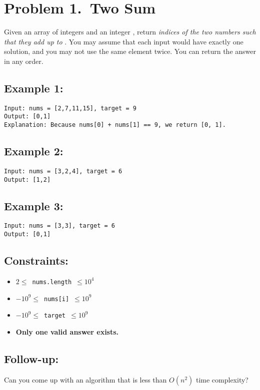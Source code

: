 
\section*{Problem 1.~Two Sum}

Given an array of integers  and an integer , return \textit{indices of the two numbers such that they add up to} . You may assume that each input would have exactly one solution, and you may not use the same element twice. You can return the answer in any order.

\subsection*{Example 1:}

\begin{lstlisting}
Input: nums = [2,7,11,15], target = 9
Output: [0,1]
Explanation: Because nums[0] + nums[1] == 9, we return [0, 1].
\end{lstlisting}


\subsection*{Example 2:}

\begin{lstlisting}
Input: nums = [3,2,4], target = 6
Output: [1,2]
\end{lstlisting}


\subsection*{Example 3:}

\begin{lstlisting}
Input: nums = [3,3], target = 6
Output: [0,1]
\end{lstlisting}


\subsection*{Constraints:}

\begin{itemize}
  \item{$2 \le \,$ \texttt{nums.length} $\, \le 10^4$}
  \item{$-10^9 \le \,$ \texttt{nums[i]} $\, \le 10^9$}
  \item{$-10^9 \le \,$ \texttt{target} $\, \le 10^9$}
  \item{\textbf{Only one valid answer exists.}}
\end{itemize}


\subsection*{Follow-up:}

Can you come up with an algorithm that is less than $O(n^2)$ time complexity?


\clearpage
